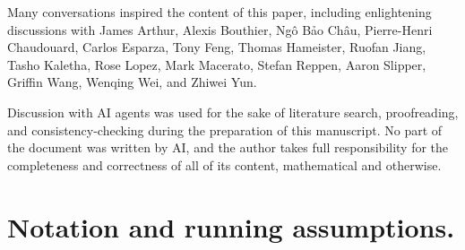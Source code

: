\documentclass[openany]{amsbook}
\theoremstyle{definition}
\theoremstyle{remark}
\numberwithin{equation}{section}
\renewcommand{\-}{\operatorname{-}}
\begin{document}
Many conversations inspired the content of this paper, including enlightening discussions with James Arthur, Alexis Bouthier, Ngô Bảo Châu, Pierre-Henri Chaudouard, Carlos Esparza, Tony Feng, Thomas Hameister, Ruofan Jiang, Tasho Kaletha, Rose Lopez, Mark Macerato, Stefan Reppen, Aaron Slipper, Griffin Wang, Wenqing Wei, and Zhiwei Yun.

Discussion with AI agents was used for the sake of literature search, proofreading, and consistency-checking during the preparation of this manuscript. No part of the document was written by AI, and the author takes full responsibility for the completeness and correctness of all of its content, mathematical and otherwise.

\section{Notation and running assumptions.}\label{subsect.notation.running.assumptions}
\end{document}
